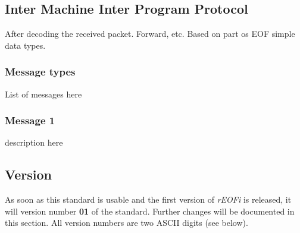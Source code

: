 \subsection{Inter Machine Inter Program Protocol}
After decoding the received packet. Forward, etc.
Based on part os EOF simple data types.
\subsubsection{Message types}
List of messages here
\subsubsection{Message 1}
description here

\subsection{Version}
As soon as this standard is usable and the first version of \emph{rEOFi}
is released, it will version number \textbf{01} of the standard.
Further changes will be documented in this section. All version numbers
are two ASCII digits (see below).

